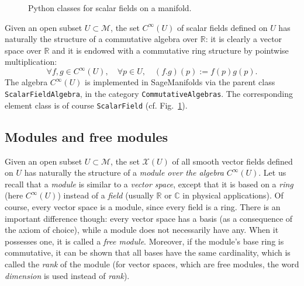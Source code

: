 \documentclass[a4paper]{jpconf}
\newcommand{\soft}[1]{\textsf{#1}}
\newcommand{\code}[1]{\texttt{#1}}
\newcommand{\SM}{\soft{SageManifolds}}
\newcommand{\be}{\begin{equation}}
\newcommand{\ee}{\end{equation}}
\begin{document}
\begin{figure}
\begin{center}

\end{center}
\caption{\label{f:scalar_classes} Python classes for scalar fields
on a manifold.}
\end{figure}

Given an open subset $U\subset\mathcal{M}$, the set $C^\infty(U)$
of scalar fields defined on $U$ has naturally the structure of a 
commutative algebra over $\mathbb{R}$: it is clearly a vector
space over $\mathbb{R}$ and it is endowed with a commutative ring structure
by pointwise multiplication:
\be
\forall f, g \in C^\infty(U),\quad \forall p\in U,\quad
(f.g)(p) := f(p) g(p) .
\ee
The algebra $C^\infty(U)$ is implemented in \SM{} via the parent
class \code{ScalarFieldAlgebra}, in the category
\code{CommutativeAlgebras}. The corresponding element class 
is of course \code{ScalarField} (cf. Fig.~\ref{f:scalar_classes}). 

\subsection{Modules and free modules} \label{s:modules}

Given an open subset $U\subset\mathcal{M}$, the set $\mathscr{X}(U)$
of all smooth vector fields defined on $U$ has naturally the structure of a 
\emph{module over the algebra} $C^\infty(U)$.
Let us recall that a \emph{module} is similar to a \emph{vector space}, except that it is based
on a \emph{ring} (here $C^\infty(U)$)
instead of a \emph{field} (usually $\mathbb{R}$ or
$\mathbb{C}$ in physical applications). Of course, every vector space is a module,
since every field is a ring.
There is an important difference though: every vector space has a basis (as a 
consequence of the axiom of choice),
while a module does not necessarily have any. 
When it possesses one, it is called a \emph{free module}. 
Moreover, if the module's base ring is commutative, it can be shown that all
bases have the same
cardinality, which is called the \emph{rank} of the module 
(for vector spaces, which are free modules, the word \emph{dimension}
is used instead of \emph{rank}). 
\end{document}
